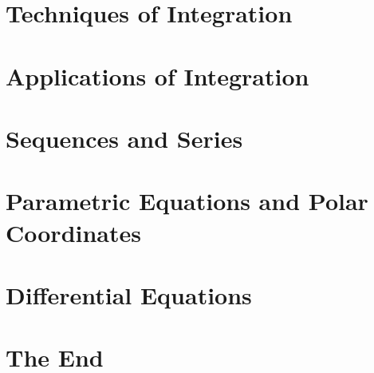 \documentclass[12pt]{article}
\begin{document}
\section{Techniques of Integration}





\section{Applications of Integration}




\section{Sequences and Series}






\section{Parametric Equations and Polar Coordinates}





\section{Differential Equations}





\section*{The End}
\end{document}
